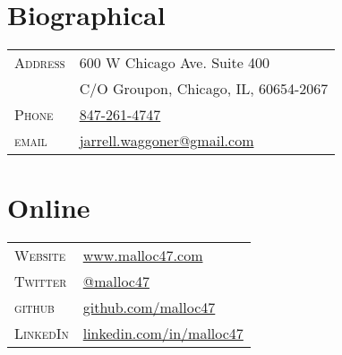 \documentclass[10pt]{article}
\begin{document}
\pagestyle{empty}


\par{\bigskip\par}



\begin{multicols}{2}
\setlength{\parskip}{0pt}
  \section{Biographical}

\begin{tabularx}{\linewidth}{@{}l X@{}}
  \textsc{Address}     & \small{600 W Chicago Ave. Suite 400} \\
                       & \small{C/O Groupon, Chicago, IL, 60654-2067} \\
  \textsc{Phone}       & \href{http://www.malloc47.com/call-me/}{847-261-4747} \\
  \textsc{email}       & \href{mailto:jarrell.waggoner@gmail.com}{jarrell.waggoner@gmail.com} \\
\end{tabularx}

\vfill
\columnbreak

\section{Online}
\begin{tabularx}{\linewidth}{@{}l X@{}}
  \textsc{Website}     & \href{http://www.malloc47.com}{www.malloc47.com} \\
  \textsc{Twitter}     & \href{https://twitter.com/malloc47}{@malloc47} \\
  \textsc{github}      & \href{http://www.github.com/malloc47}{github.com/malloc47}\\
  \textsc{LinkedIn}    & \href{http://www.linkedin.com/in/malloc47}{linkedin.com/in/malloc47} \\
\end{tabularx}

\end{multicols}
\end{document}
